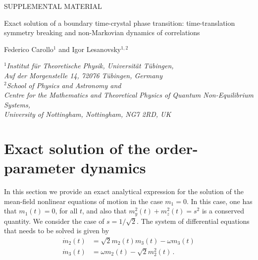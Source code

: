 \documentclass[prl,superscriptaddress,showpacs,longbibliography,reprint]{revtex4-2}
\begin{document}
\begin{center}
{\Large SUPPLEMENTAL MATERIAL}
\end{center}
\begin{center}
\vspace{0.8cm}
{\Large Exact solution  of a boundary time-crystal phase transition: time-translation symmetry breaking and non-Markovian dynamics of correlations}
\end{center}
\begin{center}
Federico Carollo$^{1}$ and Igor Lesanovsky$^{1,2}$
\end{center}
\begin{center}
$^1${\em Institut f\"ur Theoretische Physik, Universit\"at T\"ubingen,}\\
{\em Auf der Morgenstelle 14, 72076 T\"ubingen, Germany}\\
$^2${\em School of Physics and Astronomy and}\\
{\em Centre for the Mathematics and Theoretical Physics of Quantum Non-Equilibrium Systems,}\\
{\em  University of Nottingham, Nottingham, NG7 2RD, UK}\\

\end{center}










\section{Exact solution of the order-parameter dynamics}
In this section we provide an exact analytical expression for the solution of the mean-field nonlinear equations of motion in the case $m_1=0$. In this case, one has that $m_1(t)=0$, for all $t$, and also that $m_y^2(t)+m_z^2(t)=s^2$ is a conserved quantity. We consider the case of $s=1/\sqrt{2}$. The system of differential equations that needs to be solved is given by
\begin{equation}
\begin{split}
\dot{m}_2(t)&=\sqrt{2}m_2(t)m_3(t)-\omega m_3(t)\\
\dot{m}_3(t)&=\omega m_2(t) -\sqrt{2}m_2^2(t)\, .
\end{split}
    \label{mf-red}
\end{equation}
\end{document}
